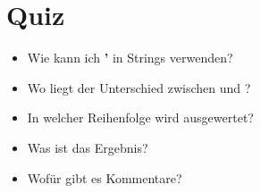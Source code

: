 \livecoding

	\section{Quiz}
	\begin{frame}
		\slidehead
		\begin{itemize}
			\item Wie kann ich \textbf{'} in Strings verwenden?
			\pause
			\item Wo liegt der Unterschied zwischen  und ?
			\pause
			\item In welcher Reihenfolge wird  ausgewertet?
			\pause
			\item Was ist das Ergebnis?
			\pause
			\item Wofür gibt es Kommentare?
		\end{itemize}
	\end{frame}


	
